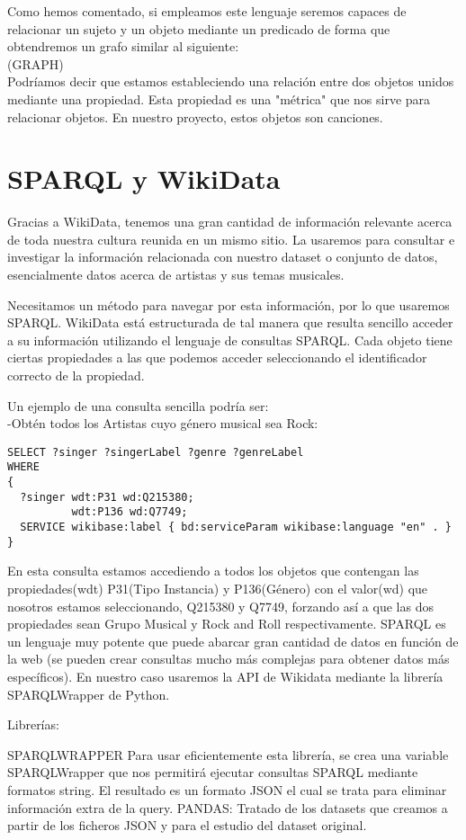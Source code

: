 Como hemos comentado, si empleamos este lenguaje seremos capaces de relacionar un sujeto y un objeto mediante un predicado de forma que obtendremos un grafo similar al siguiente:\\

(GRAPH)\\

Podríamos decir que estamos estableciendo una relación entre dos objetos unidos mediante una propiedad. Esta propiedad es una "métrica" que nos sirve para relacionar objetos. En nuestro proyecto, estos objetos son canciones.


\section{SPARQL y WikiData}

Gracias a WikiData, tenemos una gran cantidad de información relevante acerca de toda nuestra cultura reunida en un mismo sitio. La usaremos para consultar e investigar la información relacionada con nuestro dataset o conjunto de datos, esencialmente datos acerca de artistas y sus temas musicales.

Necesitamos un método para navegar por esta información, por lo que usaremos SPARQL. WikiData está estructurada de tal manera que resulta sencillo acceder a su información utilizando el lenguaje de consultas SPARQL. Cada objeto tiene ciertas propiedades a las que podemos acceder seleccionando el identificador correcto de la propiedad.

Un ejemplo de una consulta sencilla podría ser:\\

-Obtén todos los Artistas cuyo género musical sea Rock:\\

\begin{lstlisting}[language=SPARQL]
SELECT ?singer ?singerLabel ?genre ?genreLabel
WHERE
{
  ?singer wdt:P31 wd:Q215380;
      	  wdt:P136 wd:Q7749;
  SERVICE wikibase:label { bd:serviceParam wikibase:language "en" . }
}
\end{lstlisting}

En esta consulta estamos accediendo a todos los objetos que contengan las propiedades(wdt) P31(Tipo Instancia) y P136(Género) con el valor(wd) que nosotros estamos seleccionando, Q215380 y Q7749, forzando así a que las dos propiedades sean Grupo Musical y Rock and Roll respectivamente.
SPARQL es un lenguaje muy potente que puede abarcar gran cantidad de datos en función de la web (se pueden crear consultas mucho más complejas para obtener datos más específicos). En nuestro caso usaremos la API de Wikidata mediante la librería SPARQLWrapper de Python.

Librerías:

SPARQLWRAPPER
Para usar eficientemente esta librería, se crea una variable SPARQLWrapper que nos permitirá ejecutar consultas SPARQL mediante formatos string.
El resultado es un formato JSON el cual se trata para eliminar información extra de la query.
PANDAS:
Tratado de los datasets que creamos a partir de los ficheros JSON y para el estudio del dataset original.